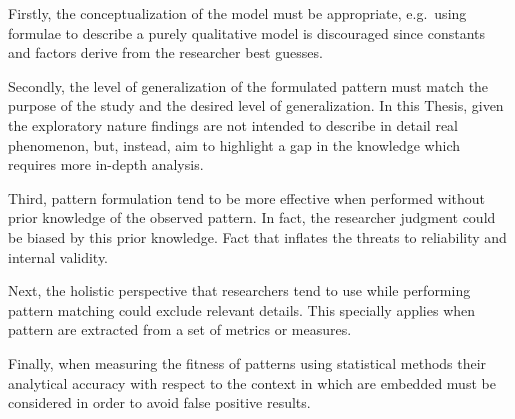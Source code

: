 Firstly, the conceptualization of the model must be appropriate, e.g.\ using formulae to describe a purely qualitative model is discouraged since constants and factors derive from the researcher best guesses.

Secondly, the level of generalization of the formulated pattern must match the purpose of the study and the desired level of generalization. In this Thesis, given the exploratory nature findings are not intended to describe in detail real phenomenon, but, instead, aim to highlight a gap in the knowledge which requires more in-depth analysis.

Third, pattern formulation tend to be more effective when performed without prior knowledge of the observed pattern. In fact, the researcher judgment could be biased by this prior knowledge. Fact that inflates the threats to reliability and internal validity.

Next, the holistic perspective that researchers tend to use while performing pattern matching could exclude relevant details. This specially applies when pattern are extracted from a set of metrics or measures.

Finally, when measuring the fitness of patterns using statistical methods their analytical accuracy with respect to the context in which are embedded must be considered in order to avoid false positive results.


